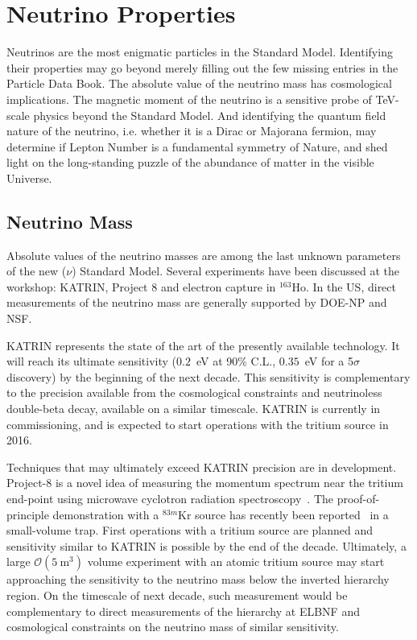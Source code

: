 \section{Neutrino Properties}
\label{sec:Properties}

Neutrinos are the most enigmatic particles in the Standard
Model. Identifying their properties may go beyond merely filling out
the few missing entries in the Particle Data Book. The absolute value
of the neutrino mass has cosmological implications. The magnetic
moment of the neutrino is a sensitive probe of TeV-scale physics
beyond the Standard Model. And identifying the quantum field nature of
the neutrino, i.e. whether it is a Dirac or Majorana fermion, may
determine if Lepton Number is a fundamental symmetry of Nature, and
shed light on the long-standing puzzle of the abundance of matter in
the visible Universe.

\subsection{Neutrino Mass}

Absolute values of the neutrino masses are among the last unknown
parameters of the new ($\nu$) Standard Model. Several experiments
have been discussed at the workshop: KATRIN, Project 8 and electron
capture in $^{163}$Ho. In the US, direct measurements of the neutrino
mass are generally supported by DOE-NP and NSF.


KATRIN represents the state of the art of the presently available
technology. It will reach its ultimate sensitivity ($0.2$~eV at 90\%
C.L., $0.35$~eV for a 5$\sigma$ discovery) by the beginning of the
next decade. This sensitivity is complementary to the precision
available from the cosmological constraints and neutrinoless
double-beta decay, available on a similar timescale. KATRIN is
currently in commissioning, and is expected to start operations with
the tritium source in 2016.

Techniques that may ultimately exceed KATRIN precision are in
development. Project-8 is a novel idea of measuring the momentum
spectrum near the tritium end-point using microwave cyclotron
radiation spectroscopy~\cite{Monreal:2009za}. The proof-of-principle
demonstration with a $^{83m}$Kr source has recently been
reported~\cite{Asner:2014cwa} in a small-volume trap. First operations
with a tritium source are planned and sensitivity similar to KATRIN is
possible by the end of the decade. Ultimately, a large
$\mathcal{O}(5~\mathrm{m}^3)$ volume experiment with an atomic tritium
source may start approaching the sensitivity to the neutrino mass
below the inverted hierarchy region. On the timescale of next decade,
such measurement would be complementary to direct measurements of the
hierarchy at ELBNF and cosmological constraints on the neutrino mass
of similar sensitivity.


